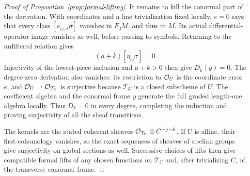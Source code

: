 \begin{proof}[Proof of Proposition~\ref{prop:formal-lifting}]
It remains to kill the conormal part of the derivation.
With coordinates and a line trivialization fixed locally,
\(e=0\) says that every class
\([e_{ij,\lambda}\sigma]\) vanishes in \(F_0M\), and thus
in \(M\).  Its actual differential-operator image vanishes
as well, before passing to symbols.  Returning to the
unfiltered relation gives
\[
 (a+k)[\eta_{ij}\sigma]=0.
\]
Injectivity of the lowest-piece inclusion and \(a+k>0\)
then give \(D_k(y)=0\).  The degree-zero derivation also
vanishes: its restriction to \(\mathcal{O}_U\) is the coordinate
error \(e\), and \(\mathcal{O}_U\to\mathcal{O}_{\mathcal T_U}\) is
surjective because \(\mathcal T_U\) is a closed subscheme
of \(U\).  The coefficient
algebra and the conormal frame \(y\) generate the full
graded length-one algebra locally.  Thus \(D_k=0\) in
every degree, completing the induction and proving
surjectivity of all the sheaf transitions.

The kernels are the stated coherent sheaves
\(\mathcal{O}_{\mathcal T_U}\otimes C^{-j-k}\).  If \(U\) is
affine, their first cohomology vanishes, so the exact
sequences of sheaves of abelian groups give surjectivity
on global sections as well.  Successive choices of lifts
then give compatible formal lifts of any chosen functions
on \(\mathcal T_U\) and, after trivializing \(C\), of the
transverse conormal frame.
\end{proof}
